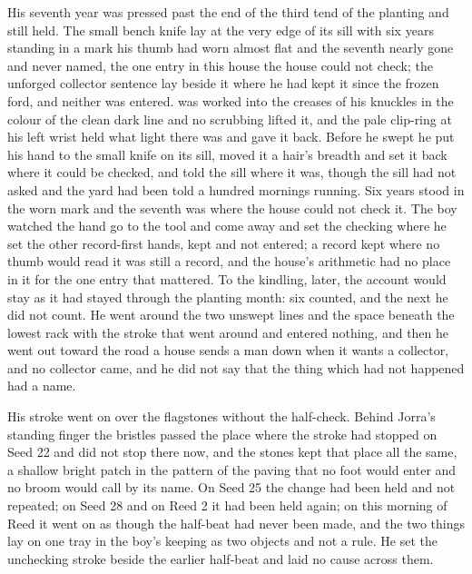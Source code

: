His seventh year was pressed past the end of the third tend of the planting and still held. The small bench knife lay at the very edge of its sill with six years standing in a mark his thumb had worn almost flat and the seventh nearly gone and never named, the one entry in this house the house could not check; the unforged collector sentence lay beside it where he had kept it since the frozen ford, and neither was entered.  was worked into the creases of his knuckles in the colour of the clean dark line and no scrubbing lifted it, and the pale clip-ring at his left wrist held what light there was and gave it back. Before he swept he put his hand to the small knife on its sill, moved it a hair's breadth and set it back where it could be checked, and told the sill where it was, though the sill had not asked and the yard had been told a hundred mornings running. Six years stood in the worn mark and the seventh was where the house could not check it. The boy watched the hand go to the tool and come away and set the checking where he set the other record-first hands, kept and not entered; a record kept where no thumb would read it was still a record, and the house's arithmetic had no place in it for the one entry that mattered. To the kindling, later, the account would stay as it had stayed through the planting month: six counted, and the next he did not count. He went around the two unswept lines and the space beneath the lowest rack with the stroke that went around and entered nothing, and then he went out toward the road a house sends a man down when it wants a collector, and no collector came, and he did not say that the thing which had not happened had a name.

His stroke went on over the flagstones without the half-check. Behind Jorra's standing finger the bristles passed the place where the stroke had stopped on Seed 22 and did not stop there now, and the stones kept that place all the same, a shallow bright patch in the pattern of the paving that no foot would enter and no broom would call by its name. On Seed 25 the change had been held and not repeated; on Seed 28 and on Reed 2 it had been held again; on this morning of Reed it went on as though the half-beat had never been made, and the two things lay on one tray in the boy's keeping as two objects and not a rule. He set the unchecking stroke beside the earlier half-beat and laid no cause across them.

